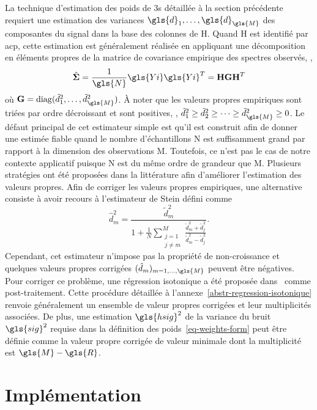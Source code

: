 La technique d'estimation des poids de \gls{3s} détaillée à la section précédente requiert une estimation des variances $\gls{d}_1,\dots,\gls{d}_{\gls{M}}$ des composantes du signal dans la base des colonnes de \gls{H}. Quand \gls{H} est identifié par \gls{acp}, cette estimation est généralement réalisée en appliquant une décomposition en éléments propres de la matrice de covariance empirique des spectres observés, \ie{},
\begin{equation}
    \hat{\boldsymbol\Sigma} = \frac{1}{\gls{N}}\gls{Yi}\gls{Yi}^T = \mathbf{H}\mathbf{G}\mathbf{H}^T
\end{equation}
où $\mathbf{G} = \mathrm{diag}(\tilde{d}_1^2, \dots, \tilde{d}_{\gls{M}}^2)$. \`A noter que les valeurs propres empiriques sont triées par ordre décroissant et sont positives, \ie{}, $\tilde{d}_1^2 \geq \tilde{d}_2^2 \geq \dots \geq \tilde{d}_{\gls{M}}^2\geq 0$. Le défaut principal de cet estimateur simple est qu'il est construit afin de donner une estimée fiable quand le nombre d'échantillons \gls{N} est suffisamment grand par rapport à la dimension des observations \gls{M}. Toutefois, ce n'est pas le cas de notre contexte applicatif puisque \gls{N} est du même ordre de grandeur que \gls{M}. Plusieurs stratégies ont été proposées dans la littérature afin d'améliorer l'estimation des valeurs propres. Afin de corriger les valeurs propres empiriques, une alternative consiste à avoir recours à l'estimateur de Stein défini comme~\cite{mestre2008improved}
\begin{equation}\label{eq-Stein-corr}
\hat{d}^2_m = 
\frac{\tilde{d}^2_m}{1+ \frac{1}{N}\sum_{\substack{j=1\\j\neq m }}^M \frac{\tilde{d}^2_m+\tilde{d}^2_j}{\tilde{d}^2_m-\tilde{d}^2_j}}.
\end{equation}
Cependant, cet estimateur n'impose pas la propriété de non-croissance et quelques valeurs propres corrigées $(\hat{d}_m)_{m=1,\dots,\gls{M}}$ peuvent être négatives. Pour corriger ce problème, une régression isotonique a été proposée dans~\cite{LinPerl1985} comme post-traitement. Cette procédure détaillée à l'annexe~\ref{abstr-regression-isotonique} renvoie généralement un ensemble de valeur propres corrigées et leur multiplicités associées. De plus, une estimation $\gls{hsig}^2$ de la variance du bruit $\gls{sig}^2$ requise dans la définition des poids~\eqref{eq-weights-form} peut être définie comme la valeur propre corrigée de valeur minimale dont la multiplicité est $\gls{M} - \gls{R}$.

%
\section{Implémentation}

